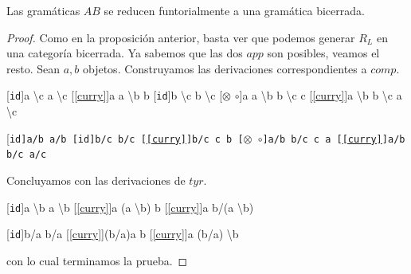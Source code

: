 \documentclass[../main.tex]{subfiles}
\begin{document}
	\begin{prop}
		Las gramáticas $AB$ se reducen funtorialmente a una gramática bicerrada.
	\end{prop} 
	\begin{proof}
		Como en la proposición anterior, basta ver que podemos generar $R_L$ en una categoría bicerrada. Ya sabemos que las dos $app$ son posibles, veamos el resto. Sean $a,b$ objetos. Construyamos las derivaciones correspondientes a $comp$.
		\begin{multicols}{2}
			\begin{center}
			\begin{prooftree}
				[{\tt{id}}]{a \backslash c \to a \backslash c}
				[\ref{curry}]{a \otimes a \backslash b \to b}
				[{\tt{id}}]{b \backslash c \to b \backslash c}
				[$\otimes$  $\circ$]{a \otimes a \backslash b \otimes b \backslash c \to c}
				[\ref{curry}]{a \backslash b \otimes b \backslash c \to a \backslash c}
			\end{prooftree}
            \end{center}
            \begin{center}
			\begin{prooftree}
				\hypo{a/b}
				[\tt{id}]{a/b \to a/b}
				\hypo{b/c}
				[\tt{id}]{b/c \to b/c}
				[\ref{curry}]{b/c \otimes c \to b}
				[$\otimes$  $\circ$]{a/b \otimes b/c \otimes c \to a}
				[\ref{curry}]{a/b \otimes b/c \to a/c}
			\end{prooftree}
            \end{center}
		\end{multicols}
		Concluyamos con las derivaciones de $tyr$.
		\begin{multicols}{2}
            \begin{center}
			\begin{prooftree}
				\hypo{a \backslash b}
				[{\tt{id}}]{a \backslash b \to a \backslash b}
				[\ref{curry}]{a \otimes (a \backslash b) \to b}
				[\ref{curry}]{a \to b/(a \backslash b)}
			\end{prooftree}
            \end{center}
            \begin{center}
			\begin{prooftree}
				\hypo{b/a}
				[{\tt{id}}]{b/a \to b/a}
				[\ref{curry}]{(b/a)\otimes a \to b}
				[\ref{curry}]{a \to (b/a) \backslash b}
			\end{prooftree}
            \end{center}
		\end{multicols} 
		con lo cual terminamos la prueba. 
	\end{proof}
	
\end{document}
